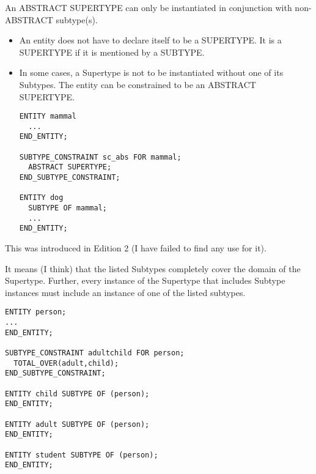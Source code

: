\begin{remarks}
\remintro


An ABSTRACT SUPERTYPE can only be instantiated in conjunction with non-ABSTRACT
subtype(s).

\remend
\end{remarks}


\begin{itemize}
\item An entity does not have to declare itself to be a SUPERTYPE. It is a
SUPERTYPE if it is mentioned by a SUBTYPE.
\item In some cases, a Supertype is not to be instantiated without one of
its Subtypes. The entity can be constrained to be an ABSTRACT SUPERTYPE.
\begin{verbatim}
ENTITY mammal
  ...
END_ENTITY;

SUBTYPE_CONSTRAINT sc_abs FOR mammal;
  ABSTRACT SUPERTYPE;
END_SUBTYPE_CONSTRAINT;

ENTITY dog
  SUBTYPE OF mammal;
  ...
END_ENTITY;
\end{verbatim}
\end{itemize}

\begin{remarks}
\remintro


This was introduced in Edition 2 (I have failed to find any use for it).

It means (I think) that the listed Subtypes completely cover the domain
of the Supertype. Further, every instance of the Supertype that includes
Subtype instances must include an instance of one of the listed subtypes.


\remend
\end{remarks}


\begin{verbatim}
ENTITY person;
...
END_ENTITY;

SUBTYPE_CONSTRAINT adultchild FOR person;
  TOTAL_OVER(adult,child);
END_SUBTYPE_CONSTRAINT;

ENTITY child SUBTYPE OF (person);
END_ENTITY;

ENTITY adult SUBTYPE OF (person);
END_ENTITY;

ENTITY student SUBTYPE OF (person);
END_ENTITY;
\end{verbatim}

